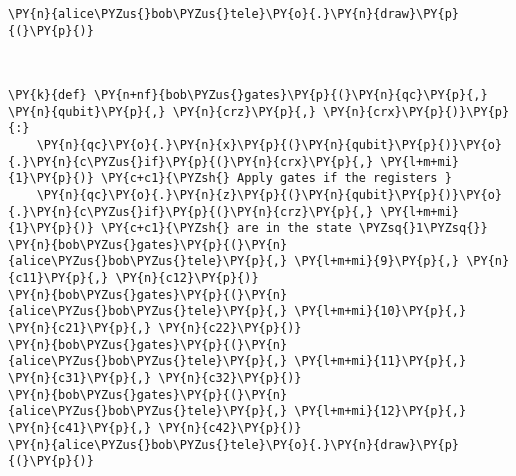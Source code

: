     \begin{tcolorbox}[breakable, size=fbox, boxrule=1pt, pad at break*=1mm,colback=cellbackground, colframe=cellborder]
\begin{Verbatim}[commandchars=\\\{\}]
\PY{n}{alice\PYZus{}bob\PYZus{}tele}\PY{o}{.}\PY{n}{draw}\PY{p}{(}\PY{p}{)}
\end{Verbatim}
\end{tcolorbox}
 
            
    
    \begin{center}
    \end{center}
    { \hspace*{\fill} \\}
    

    \begin{tcolorbox}[breakable, size=fbox, boxrule=1pt, pad at break*=1mm,colback=cellbackground, colframe=cellborder]
\begin{Verbatim}[commandchars=\\\{\}]
\PY{k}{def} \PY{n+nf}{bob\PYZus{}gates}\PY{p}{(}\PY{n}{qc}\PY{p}{,} \PY{n}{qubit}\PY{p}{,} \PY{n}{crz}\PY{p}{,} \PY{n}{crx}\PY{p}{)}\PY{p}{:}
    \PY{n}{qc}\PY{o}{.}\PY{n}{x}\PY{p}{(}\PY{n}{qubit}\PY{p}{)}\PY{o}{.}\PY{n}{c\PYZus{}if}\PY{p}{(}\PY{n}{crx}\PY{p}{,} \PY{l+m+mi}{1}\PY{p}{)} \PY{c+c1}{\PYZsh{} Apply gates if the registers }
    \PY{n}{qc}\PY{o}{.}\PY{n}{z}\PY{p}{(}\PY{n}{qubit}\PY{p}{)}\PY{o}{.}\PY{n}{c\PYZus{}if}\PY{p}{(}\PY{n}{crz}\PY{p}{,} \PY{l+m+mi}{1}\PY{p}{)} \PY{c+c1}{\PYZsh{} are in the state \PYZsq{}1\PYZsq{}}
\PY{n}{bob\PYZus{}gates}\PY{p}{(}\PY{n}{alice\PYZus{}bob\PYZus{}tele}\PY{p}{,} \PY{l+m+mi}{9}\PY{p}{,} \PY{n}{c11}\PY{p}{,} \PY{n}{c12}\PY{p}{)}
\PY{n}{bob\PYZus{}gates}\PY{p}{(}\PY{n}{alice\PYZus{}bob\PYZus{}tele}\PY{p}{,} \PY{l+m+mi}{10}\PY{p}{,} \PY{n}{c21}\PY{p}{,} \PY{n}{c22}\PY{p}{)}
\PY{n}{bob\PYZus{}gates}\PY{p}{(}\PY{n}{alice\PYZus{}bob\PYZus{}tele}\PY{p}{,} \PY{l+m+mi}{11}\PY{p}{,} \PY{n}{c31}\PY{p}{,} \PY{n}{c32}\PY{p}{)}
\PY{n}{bob\PYZus{}gates}\PY{p}{(}\PY{n}{alice\PYZus{}bob\PYZus{}tele}\PY{p}{,} \PY{l+m+mi}{12}\PY{p}{,} \PY{n}{c41}\PY{p}{,} \PY{n}{c42}\PY{p}{)}
\PY{n}{alice\PYZus{}bob\PYZus{}tele}\PY{o}{.}\PY{n}{draw}\PY{p}{(}\PY{p}{)}
\end{Verbatim}
\end{tcolorbox}
 
